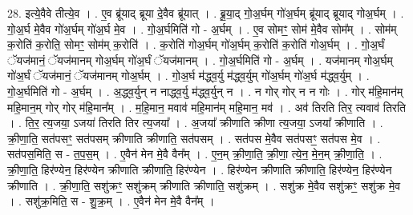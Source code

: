 \documentclass[17pt]{extarticle}
\begin{document}
28. इत्ये॒वैवे तीत्ये॒व । . ए॒व ब्रू॑याद् ब्रूया दे॒वैव ब्रू॑यात् । . ब्रू॒या॒द् गो॒अ॒र्घम् गो॑अ॒र्घम् ब्रू॑याद् ब्रूयाद् गोअ॒र्घम् । . गो॒अ॒र्घ मे॒वैव गो॑अ॒र्घम् गो॑अ॒र्घ मे॒व । . गो॒अ॒र्घमिति॑ गो - अ॒र्घम् । . ए॒व सोमꣳ॒॒ सोम॑ मे॒वैव सोम᳚म् । . सोम॑म् क॒रोति॑ क॒रोति॒ सोमꣳ॒॒ सोम॑म् क॒रोति॑ । . क॒रोति॑ गोअ॒र्घम् गो॑अ॒र्घम् क॒रोति॑ क॒रोति॑ गोअ॒र्घम् । . गो॒अ॒र्घं ॅयज॑मानं॒ ॅयज॑मानम् गोअ॒र्घम् गो॑अ॒र्घं ॅयज॑मानम् । . गो॒अ॒र्घमिति॑ गो - अ॒र्घम् । . यज॑मानम् गोअ॒र्घम् गो॑अ॒र्घं ॅयज॑मानं॒ ॅयज॑मानम् गोअ॒र्घम् । . गो॒अ॒र्घ म॑द्ध्व॒र्यु म॑द्ध्व॒र्युम् गो॑अ॒र्घम् गो॑अ॒र्घ म॑द्ध्व॒र्युम् । . गो॒अ॒र्घमिति॑ गो - अ॒र्घम् । . अ॒द्ध्व॒र्युन् न नाद्ध्व॒र्यु म॑द्ध्व॒र्युन् न । . न गोर् गोर् न न गोः । . गोर् म॑हि॒मान॑म् महि॒मान॒म् गोर् गोर् म॑हि॒मान᳚म् । . म॒हि॒मान॒ मवाव॑ महि॒मान॑म् महि॒मान॒ मव॑ । . अव॑ तिरति तिर॒ त्यवाव॑ तिरति । . ति॒र॒ त्य॒जया॒ ऽजया॑ तिरति तिर त्य॒जया᳚ । . अ॒जया᳚ क्रीणाति क्रीणा त्य॒जया॒ ऽजया᳚ क्रीणाति । . क्री॒णा॒ति॒ सत॑पसꣳ॒॒ सत॑पसम् क्रीणाति क्रीणाति॒ सत॑पसम् । . सत॑पस मे॒वैव सत॑पसꣳ॒॒ सत॑पस मे॒व । . सत॑पस॒मिति॒ स - त॒प॒स॒म् । . ए॒वैन॑ मेन मे॒वै वैन᳚म् । . ए॒न॒म् क्री॒णा॒ति॒ क्री॒णा॒ त्ये॒न॒ मे॒न॒म् क्री॒णा॒ति॒ । . क्री॒णा॒ति॒ हिर॑ण्येन॒ हिर॑ण्येन क्रीणाति क्रीणाति॒ हिर॑ण्येन । . हिर॑ण्येन क्रीणाति क्रीणाति॒ हिर॑ण्येन॒ हिर॑ण्येन क्रीणाति । . क्री॒णा॒ति॒ सशु॑क्रꣳ॒॒ सशु॑क्रम् क्रीणाति क्रीणाति॒ सशु॑क्रम् । . सशु॑क्र मे॒वैव सशु॑क्रꣳ॒॒ सशु॑क्र मे॒व । . सशु॑क्र॒मिति॒ स - शु॒क्र॒म् । . ए॒वैन॑ मेन मे॒वै वैन᳚म् । \newline
\end{document}
